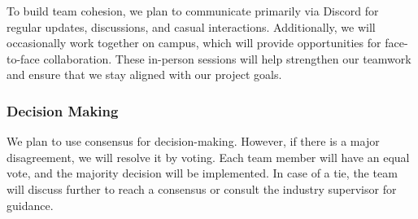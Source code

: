 \documentclass{article}
\begin{document}
To build team cohesion, we plan to communicate primarily via Discord for regular
updates, discussions, and casual interactions. Additionally, we will
occasionally work together on campus, which will provide opportunities for
face-to-face collaboration. These in-person sessions will help strengthen our
teamwork and ensure that we stay aligned with our project goals.

\subsubsection*{Decision Making} 

We plan to use consensus for decision-making. However, if there is a major
disagreement, we will resolve it by voting. Each team member will have an equal
vote, and the majority decision will be implemented. In case of a tie, the team
will discuss further to reach a consensus or consult the industry supervisor for
guidance.
\end{document}
